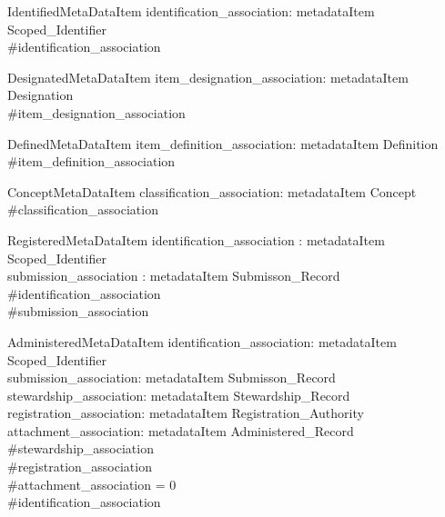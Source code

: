 \documentclass{llncs}
\begin{document}
\begin{schema}{IdentifiedMetaDataItem}
identification\_association: metadataItem \pfun Scoped\_Identifier \\
\where
 \#identification\_association  \\
\end{schema}

\begin{schema}{DesignatedMetaDataItem}
item\_designation\_association: metadataItem \pfun Designation \\
\where
 \#item\_designation\_association  \\
\end{schema}

\begin{schema}{DefinedMetaDataItem}
item\_definition\_association: metadataItem \pfun Definition \\
\where
 \#item\_definition\_association  \\
\end{schema}

\begin{schema}{ConceptMetaDataItem}
classification\_association: metadataItem \pfun Concept \\
\where
 \#classification\_association  \\
\end{schema}

\begin{schema}{RegisteredMetaDataItem}
identification\_association : metadataItem \pfun Scoped\_Identifier \\
submission\_association : metadataItem \pfun Submisson\_Record \\
\where
 \#identification\_association  \\
 \#submission\_association  \\
\end{schema}

\begin{schema}{AdministeredMetaDataItem}
identification\_association: metadataItem \pfun Scoped\_Identifier \\
submission\_association: metadataItem \pfun Submisson\_Record \\
stewardship\_association: metadataItem \pfun Stewardship\_Record \\
registration\_association: metadataItem \pfun Registration\_Authority \\
attachment\_association: metadataItem \pfun Administered\_Record \\
\where
 \#stewardship\_association \\
 \#registration\_association  \\
 \#attachment\_association = 0 \\
 \#identification\_association  \\
\end{schema}
\end{document}
